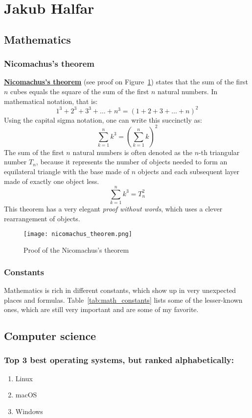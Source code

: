 \section{Jakub Halfar}
\label{sec:jakub_halfar}

\subsection{Mathematics}
\subsubsection{Nicomachus's theorem}
\underline{\textbf{Nicomachus's theorem}} (see proof on Figure~\ref{fig:nicomachus_proof}) states that the sum of the first $n$ cubes equals the square of the sum of the first $n$ natural numbers. In mathematical notation, that is:
\[
1^3 + 2^3 + 3^3 + \dots + n^3 = (1 + 2 + 3 + \dots + n)^2
\]
Using the capital sigma notation, one can write this succinctly as:
\[
\sum_{k=1}^n k^3 = \left( \sum_{k=1}^n k \right)^2
\]
The sum of the first $n$ natural numbers is often denoted as the $n$-th triangular number $T_n$, because it represents the number of objects needed to form an equilateral triangle with the base made of $n$ objects and each subsequent layer made of exactly one object less.
\[
\sum_{k=1}^n k^3 = T_{n}^2
\]
This theorem has a very elegant \textit{proof without words}, which uses a clever rearrangement of objects.
\begin{figure}[htbp] %
    \centering
    \texttt{[image: nicomachus\_theorem.png]} %
    \caption{Proof of the Nicomachus's theorem}
    \label{fig:nicomachus_proof}
\end{figure}

\subsubsection{Constants}
Mathematics is rich in different constants, which show up in very unexpected places and formulas. Table~\ref{tab:math_constants} lists some of the lesser-known ones, which are still very important and are some of my favorite.

\newpage

\subsection{Computer science}
\subsubsection{Top 3 best operating systems, but ranked alphabetically:}
\begin{enumerate}
    \item Linux
    \item macOS
    \item Windows
\end{enumerate}

